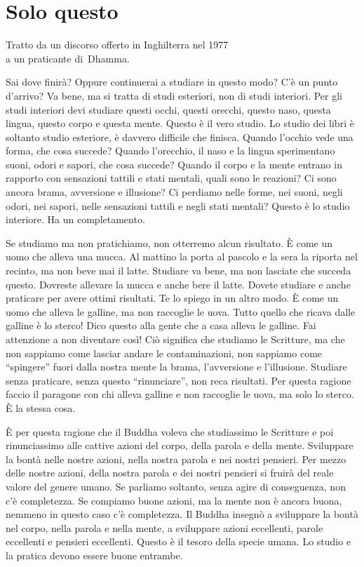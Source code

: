 \chapter{Solo questo}

\begin{openingQuote}
  \centering

  Tratto da un discorso offerto in Inghilterra nel 1977\\
  a un praticante di~Dhamma.
\end{openingQuote}

Sai dove finirà? Oppure continuerai a studiare in questo modo? C'è un
punto d'arrivo? Va bene, ma si tratta di studi esteriori, non di studi
interiori. Per gli studi interiori devi studiare questi occhi, questi
orecchi, questo naso, questa lingua, questo corpo e questa mente. Questo
è il vero studio. Lo studio dei libri è soltanto studio esteriore, è
davvero difficile che finisca. Quando l'occhio vede una forma, che cosa
succede? Quando l'orecchio, il naso e la lingua sperimentano suoni,
odori e sapori, che cosa succede? Quando il corpo e la mente entrano in
rapporto con sensazioni tattili e stati mentali, quali sono le reazioni?
Ci sono ancora brama, avversione e illusione? Ci perdiamo nelle forme,
nei suoni, negli odori, nei sapori, nelle sensazioni tattili e negli
stati mentali? Questo è lo studio interiore. Ha un completamento.

Se studiamo ma non pratichiamo, non otterremo alcun risultato. È come un
uomo che alleva una mucca. Al mattino la porta al pascolo e la sera la
riporta nel recinto, ma non beve mai il latte. Studiare va bene, ma non
lasciate che succeda questo. Dovreste allevare la mucca e anche bere il
latte. Dovete studiare e anche praticare per avere ottimi risultati. Te
lo spiego in un altro modo. È come un uomo che alleva le galline, ma non
raccoglie le uova. Tutto quello che ricava dalle galline è lo sterco!
Dico questo alla gente che a casa alleva le galline. Fai attenzione a
non diventare così! Ciò significa che studiamo le Scritture, ma che non
sappiamo come lasciar andare le contaminazioni, non sappiamo come
``spingere'' fuori dalla nostra mente la brama, l'avversione e
l'illusione. Studiare senza praticare, senza questo ``rinunciare'', non
reca risultati. Per questa ragione faccio il paragone con chi alleva
galline e non raccoglie le uova, ma solo lo sterco. È la stessa cosa.

È per questa ragione che il Buddha voleva che studiassimo le Scritture e
poi rinunciassimo alle cattive azioni del corpo, della parola e della
mente. Sviluppare la bontà nelle nostre azioni, nella nostra parola e
nei nostri pensieri. Per mezzo delle nostre azioni, della nostra parola
e dei nostri pensieri si fruirà del reale valore del genere umano. Se
parliamo soltanto, senza agire di conseguenza, non c'è completezza. Se
compiamo buone azioni, ma la mente non è ancora buona, nemmeno in questo
caso c'è completezza. Il Buddha insegnò a sviluppare la bontà nel corpo,
nella parola e nella mente, a sviluppare azioni eccellenti, parole
eccellenti e pensieri eccellenti. Questo è il tesoro della specie umana.
Lo studio e la pratica devono essere buone entrambe.

